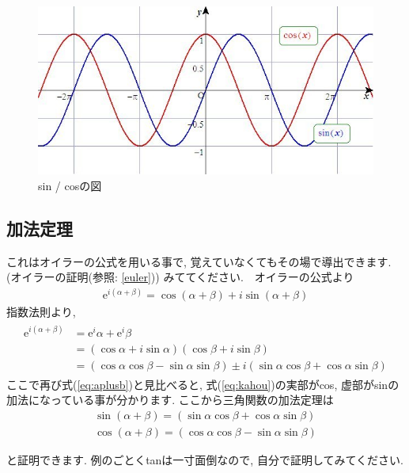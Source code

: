 \documentclass[11pt,a4paper]{jreport}
\begin{document}
\begin{figure}[H]
\label{im:sincos}
  \centering
  \includegraphics[width=120mm,bb=0 0 601 301]{figures/sincos.jpg}
  \caption{sin / cosの図}
\end{figure}

\subsection{加法定理\label{addition_theorem}}
これはオイラーの公式を用いる事で, 覚えていなくてもその場で導出できます. (オイラーの証明(参照: \ref{euler})) みててください.　オイラーの公式より
\begin{eqnarray}
\mathrm{e}^{i(\alpha + \beta)} = \cos (\alpha + \beta) + i\sin (\alpha + \beta)
\label{eq:aplusb}
\end{eqnarray}
指数法則より,
\begin{eqnarray}
\begin{split}
\mathrm{e}^{i(\alpha + \beta)} &= \mathrm{e}^i\alpha + \mathrm{e}^i\beta \\ &= (\cos \alpha + i\sin\alpha)(\cos\beta + i\sin\beta) \\
&= (\cos\alpha\cos\beta - \sin\alpha\sin\beta)\pm i(\sin\alpha\cos\beta + \cos\alpha\sin\beta)
\end{split}
\label{eq:kahou}
\end{eqnarray}
ここで再び式(\ref{eq:aplusb})と見比べると, 式(\ref{eq:kahou})の実部がcos, 虚部がsinの加法になっている事が分かります. ここから三角関数の加法定理は
\begin{eqnarray}
\sin (\alpha + \beta) = (\sin\alpha\cos\beta + \cos\alpha\sin\beta)\\
\cos (\alpha + \beta) = (\cos\alpha\cos\beta - \sin\alpha\sin\beta)
\label{kahouteiri}
\end{eqnarray}

と証明できます. 例のごとくtanは一寸面倒なので, 自分で証明してみてください.
\end{document}
